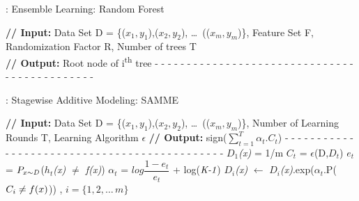 \documentclass[10pt,journal,compsoc]{IEEEtran}
\begin{document}
\begin{algorithm}[!t]
\caption{: Ensemble Learning: Random Forest}\label{alg:rf}
\begin{algorithmic}[1]
\footnotesize
\STATE \textbf{// Input:} Data Set D = \{(\(x_1, y_1\)),(\(x_2, y_2\)), \dots\, ((\(x_m, y_m\))\}, Feature Set F, Randomization Factor R, Number of trees T 
\\\textbf{// Output:} Root node of i\textsuperscript{th} tree
\STATE - - - - - - - - - - - - - - - - - - - - - - - - - - - - - - - - - - - - - - - - - - - - -
\ENDIF
{}  
\ENDFOR
\ENDFOR
{}
\end{algorithmic}
\end{algorithm}

\begin{algorithm}[!t]
\caption{: Stagewise Additive Modeling: SAMME }\label{alg:samme}
\begin{algorithmic}[1]
\footnotesize
\STATE \textbf{// Input:} Data Set D = \{(\(x_1, y_1\)),(\(x_2, y_2\)), \dots\, ((\(x_m, y_m\))\}, Number of Learning Rounds T, Learning Algorithm $ \epsilon $  
\STATE \textbf{// Output:} sign($\sum_{t=1}^{T} \alpha_t.C_t$)
\STATE - - - - - - - - - - - - - - - - - - - - - - - - - - - - - - - - - - - - - - - - - - - - -
\STATE \emph{$D_1$(x)} = 1/m 
\STATE \emph{$C_t$} = $\epsilon$(D,\emph{$D_t$}) 
\STATE $e_t$ = \emph{$P_{x \sim \emph{D}}$}(\emph{$h_t$(x) $\neq$ f(x)}) 
\STATE $\alpha_t$ = $log{\dfrac{1-e_t}{e_t}}$ + log($\emph{K-1}$) 
\STATE \emph{$D_i$(x)} $\leftarrow$ \emph{$D_i$(x)}.exp($\alpha_t$.P($\emph{$C_i$} \neq f(x)$)) , $ i = \{1, 2, \dots\, m\}$
\ENDFOR 
\end{algorithmic}
\end{algorithm}
\end{document}
